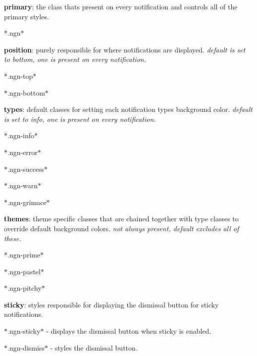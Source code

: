 \begin{DoxyItemize}
\item {\bfseries primary}\+: the class that\textquotesingle{}s present on every notification and controls all of the primary styles.
\begin{DoxyItemize}
\item $\ast$.ngn$\ast$
\end{DoxyItemize}
\item {\bfseries position}\+: purely responsible for where notifications are displayed. {\itshape default is set to bottom, one is present on every notification.}
\begin{DoxyItemize}
\item $\ast$.ngn-\/top$\ast$
\item $\ast$.ngn-\/bottom$\ast$
\end{DoxyItemize}
\item {\bfseries types}\+: default classes for setting each notification type\textquotesingle{}s background color. {\itshape default is set to info, one is present on every notification.}
\begin{DoxyItemize}
\item $\ast$.ngn-\/info$\ast$
\item $\ast$.ngn-\/error$\ast$
\item $\ast$.ngn-\/success$\ast$
\item $\ast$.ngn-\/warn$\ast$
\item $\ast$.ngn-\/grimace$\ast$
\end{DoxyItemize}
\item {\bfseries themes}\+: theme specific classes that are chained together with type classes to override default background colors. {\itshape not always present, default excludes all of these.}
\begin{DoxyItemize}
\item $\ast$.ngn-\/prime$\ast$
\item $\ast$.ngn-\/pastel$\ast$
\item $\ast$.ngn-\/pitchy$\ast$
\end{DoxyItemize}
\item {\bfseries sticky}\+: styles responsible for displaying the dismissal button for sticky notifications.
\begin{DoxyItemize}
\item $\ast$.ngn-\/sticky$\ast$ -\/ displays the dismissal button when sticky is enabled.
\item $\ast$.ngn-\/dismiss$\ast$ -\/ styles the dismissal button.
\end{DoxyItemize}
\end{DoxyItemize}

